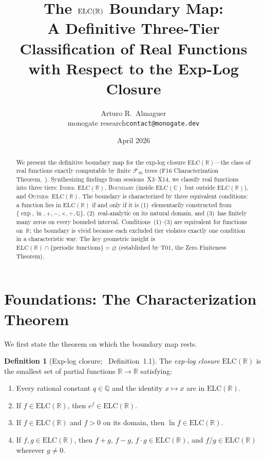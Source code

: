 \documentclass[12pt,a4paper]{article}
\title{The $\ELC$ Boundary Map:\\[4pt]
       A Definitive Three-Tier Classification of Real Functions\\[4pt]
       with Respect to the Exp-Log Closure}
\author{Arturo R.\ Almaguer\\
  \small monogate research\quad\texttt{contact@monogate.dev}}
\date{April 2026 \quad [Session X15]}
\theoremstyle{definition}
\newtheorem{definition}[theorem]{Definition}
\newcommand{\ELC}{\mathrm{ELC}(\mathbb{R})}
\newcommand{\ELCcx}{\mathrm{ELC}(\mathbb{C})}
\newcommand{\R}{\mathbb{R}}
\newcommand{\Q}{\mathbb{Q}}
\newcommand{\F}{\mathcal{F}_{16}}
\begin{document}
\maketitle

\begin{abstract}
We present the definitive boundary map for the exp-log closure
$\ELC$---the class of real functions exactly computable by finite $\F$ trees
(F16 Characterization Theorem,~\cite{F16}).  Synthesizing findings from
sessions~X3--X14, we classify real functions into three tiers:
\textsc{Inside}~$\ELC$,
\textsc{Boundary} (inside $\ELCcx$ but outside $\ELC$),
and \textsc{Outside}~$\ELC$.
The boundary is characterized by three equivalent conditions:
a function lies in $\ELC$ if and only if it is
(1)~elementarily constructed from $\{\exp, \ln, +, -, \times, \div, \Q\}$,
(2)~real-analytic on its natural domain, and
(3)~has finitely many zeros on every bounded interval.
Conditions~(1)--(3) are equivalent for functions on~$\R$;
the boundary is vivid because each excluded tier violates exactly
one condition in a characteristic way.
The key geometric insight is $\ELC \cap \{\text{periodic functions}\} = \varnothing$
(established by T01, the Zero Finiteness Theorem).
\end{abstract}

\tableofcontents
\bigskip

\section{Foundations: The Characterization Theorem}
\label{sec:foundations}

We first state the theorem on which the boundary map rests.

\begin{definition}[Exp-log closure; \cite{F16}~Definition~1.1]
\label{def:elc}
The \emph{exp-log closure} $\ELC$ is the smallest set of partial functions
$\R\to\R$ satisfying:
\begin{enumerate}[label=(\roman*)]
  \item Every rational constant $q\in\Q$ and the identity $x\mapsto x$
        are in $\ELC$.
  \item If $f\in\ELC$, then $e^f\in\ELC$.
  \item If $f\in\ELC$ and $f>0$ on its domain, then $\ln f\in\ELC$.
  \item If $f,g\in\ELC$, then $f+g$, $f-g$, $f\cdot g\in\ELC$, and
        $f/g\in\ELC$ wherever $g\neq 0$.
\end{enumerate}
\end{definition}
\end{document}
